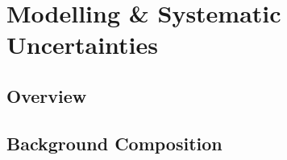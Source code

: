 \section{Modelling \& Systematic Uncertainties}\label{sec:vhbb_modelling}

\subsection{Overview}



\subsection{Background Composition}

